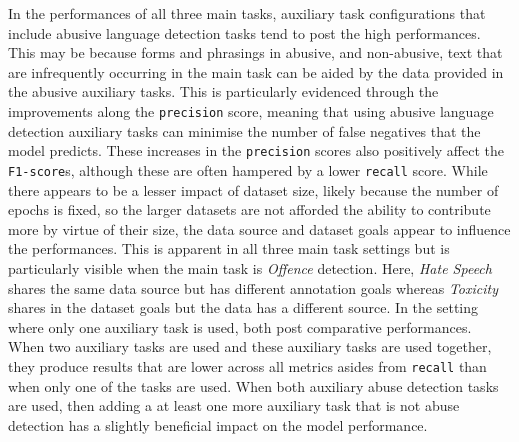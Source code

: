 In the performances of all three main tasks, auxiliary task configurations that include abusive language detection tasks tend to post the high performances.
This may be because forms and phrasings in abusive, and non-abusive, text that are infrequently occurring in the main task can be aided by the data provided in the abusive auxiliary tasks.
This is particularly evidenced through the improvements along the \texttt{precision} score, meaning that using abusive language detection auxiliary tasks can minimise the number of false negatives that the model predicts.
These increases in the \texttt{precision} scores also positively affect the \texttt{F1-score}s, although these are often hampered by a lower \texttt{recall} score.
While there appears to be a lesser impact of dataset size, likely because the number of epochs is fixed, so the larger datasets are not afforded the ability to contribute more by virtue of their size, the data source and dataset goals appear to influence the performances.
This is apparent in all three main task settings but is particularly visible when the main task is \textit{Offence} detection.
Here, \textit{Hate Speech} shares the same data source but has different annotation goals whereas \textit{Toxicity} shares in the dataset goals but the data has a different source.
In the setting where only one auxiliary task is used, both post comparative performances.
When two auxiliary tasks are used and these auxiliary tasks are used together, they produce results that are lower across all metrics asides from \texttt{recall} than when only one of the tasks are used.
When both auxiliary abuse detection tasks are used, then adding a at least one more auxiliary task that is not abuse detection has a slightly beneficial impact on the model performance.

